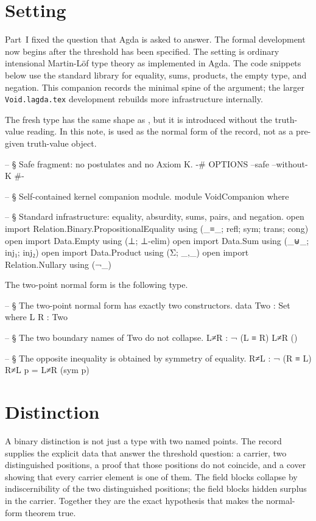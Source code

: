 \documentclass[11pt]{article}
\begin{document}
\section{Setting}

Part~I fixed the question that Agda is asked to answer.  The formal
development now begins after the threshold has been specified.  The
setting is ordinary intensional Martin-L\"of type theory as implemented
in Agda.  The code snippets below use the standard library for equality,
sums, products, the empty type, and negation.  This companion records the
minimal spine of the argument; the larger \texttt{Void.lagda.tex}
development rebuilds more infrastructure internally.

The fresh type  has the same shape as
, but it is introduced without the truth-value
reading.  In this note,  is used as the normal form of
the  record, not as a pre-given truth-value
object.

\begin{code}
-- § Safe fragment: no postulates and no Axiom K.
{-# OPTIONS --safe --without-K #-}

-- § Self-contained kernel companion module.
module VoidCompanion where

-- § Standard infrastructure: equality, absurdity, sums, pairs, and negation.
open import Relation.Binary.PropositionalEquality using (_≡_; refl; sym; trans; cong)
open import Data.Empty using (⊥; ⊥-elim)
open import Data.Sum using (_⊎_; inj₁; inj₂)
open import Data.Product using (Σ; _,_)
open import Relation.Nullary using (¬_)
\end{code}

The two-point normal form is the following type.

\begin{code}
-- § The two-point normal form has exactly two constructors.
data Two : Set where
  L R : Two

-- § The two boundary names of Two do not collapse.
L≠R : ¬ (L ≡ R)
L≠R ()

-- § The opposite inequality is obtained by symmetry of equality.
R≠L : ¬ (R ≡ L)
R≠L p = L≠R (sym p)
\end{code}

\section{Distinction}

A binary distinction is not just a type with two named points.  The
record supplies the explicit data that answer the threshold question:
a carrier, two distinguished positions, a proof that those positions do
not coincide, and a cover showing that every carrier element is one of
them.  The  field blocks collapse by
indiscernibility of the two distinguished positions; the
 field blocks hidden
surplus in the carrier.  Together they are the exact hypothesis that
makes the normal-form theorem true.
\end{document}
